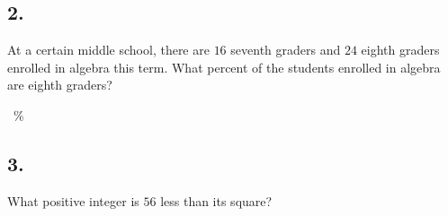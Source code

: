 \documentclass[12pt]{article}
\begin{document}
\subsection*{2.}
At a certain middle school, there are $16$ seventh graders and $24$ eighth graders enrolled in algebra this term. What percent of the students enrolled in algebra are eighth graders?

\nopagebreak

\fbox{\phantom{ANSWER}}~\%

\begin{answer}
%
\end{answer}



\subsection*{3.}
What positive integer is $56$ less than its square?

\nopagebreak

\fbox{\phantom{ANSWER}}
\end{document}
